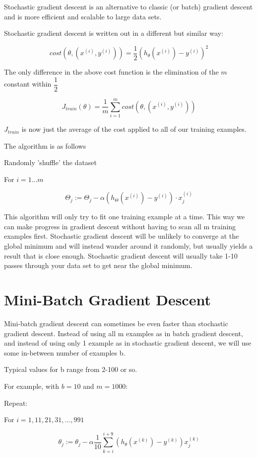 \documentclass[a4paper,11pt]{report}
\begin{document}
Stochastic gradient descent is an alternative to classic (or batch) gradient descent and is more efficient and scalable to large data sets.

Stochastic gradient descent is written out in a different but similar way:

$$cost(\theta,(x^{(i)}, y^{(i)})) = \dfrac{1}{2}(h_{\theta}(x^{(i)}) - y^{(i)})^2$$

The only difference in the above cost function is the elimination of the $m$ constant within $\dfrac{1}{2}$

$$J_{train}(\theta) = \dfrac{1}{m} \displaystyle \sum_{i=1}^m cost(\theta, (x^{(i)}, y^{(i)}))$$

$J_{train}$ is now just the average of the cost applied to all of our training examples.

The algorithm is as follows

Randomly 'shuffle' the dataset 

For $i = 1\dots m$

$$\Theta_j := \Theta_j - \alpha (h_{\Theta}(x^{(i)}) - y^{(i)}) \cdot x^{(i)}_j$$

This algorithm will only try to fit one training example at a time. This way we can make progress in gradient descent without having to scan all m training examples first. Stochastic gradient descent will be unlikely to converge at the global minimum and will instead wander around it randomly, but usually yields a result that is close enough. Stochastic gradient descent will usually take 1-10 passes through your data set to get near the global minimum.

\section{Mini-Batch Gradient Descent}

Mini-batch gradient descent can sometimes be even faster than stochastic gradient descent. Instead of using all m examples as in batch gradient descent, and instead of using only 1 example as in stochastic gradient descent, we will use some in-between number of examples b.

Typical values for b range from 2-100 or so.

For example, with $b=10$ and $m=1000$:

Repeat:

For $i = 1,11,21,31,\dots,991$

$$\theta_j := \theta_j - \alpha \dfrac{1}{10} \displaystyle \sum_{k=i}^{i+9} (h_\theta(x^{(k)}) - y^{(k)})x_j^{(k)}$$
\end{document}
